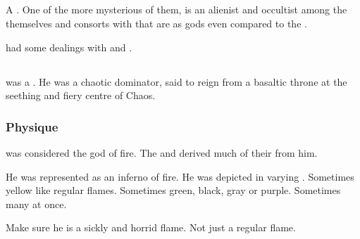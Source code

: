 \subsection{\NerrhanKoss}
\index{\NerrhanKoss}
A \xs. 
One of the more mysterious of them, \NerrhanKoss{} is an alienist and occultist among the \xss{} themselves and consorts with  that are as gods even compared to the \xss. 

\NerrhanKoss{} had some dealings with \QuessanthIshnaruchaefir{} and . 















\subsection{\RuinSatha}
\index{\RuinSatha}
\RuinSatha was a \xs. 
He was a chaotic dominator, said to reign from a basaltic throne at the seething and fiery centre of Chaos.





\subsubsection{Physique}
\RuinSatha was considered the \xs god of fire. 
The \dragons and \rethyaxes derived much of their  from him. 

He was represented as an inferno of fire. 
He was depicted in varying \colours.
Sometimes yellow like regular flames. 
Sometimes green, black, gray or purple. 
Sometimes many \colours at once. 

Make sure he is a sickly and horrid flame. 
Not just a regular flame. 






